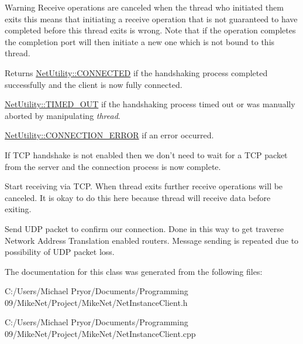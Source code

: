 \begin{DoxyWarning}{Warning}
Receive operations are canceled when the thread who initiated them exits this means that initiating a receive operation that is not guaranteed to have completed before this thread exits is wrong. Note that if the operation completes the completion port will then initiate a new one which is not bound to this thread.
\end{DoxyWarning}
\begin{DoxyReturn}{Returns}
\hyperlink{class_net_utility_a7eae52138f8bd597ffc67ebf07e86b6da9c07ac24fb9bdd4157ace978968721fd}{NetUtility::CONNECTED} if the handshaking process completed successfully and the client is now fully connected. 

\hyperlink{class_net_utility_a7eae52138f8bd597ffc67ebf07e86b6da319e02f6059b4b08edd70c16fa5206fd}{NetUtility::TIMED\_\-OUT} if the handshaking process timed out or was manually aborted by manipulating {\itshape thread\/}. 

\hyperlink{class_net_utility_a7eae52138f8bd597ffc67ebf07e86b6da7c6b34544a99c4c264366f2fed4f0973}{NetUtility::CONNECTION\_\-ERROR} if an error occurred. 
\end{DoxyReturn}


If TCP handshake is not enabled then we don't need to wait for a TCP packet from the server and the connection process is now complete.

Start receiving via TCP. When thread exits further receive operations will be canceled. It is okay to do this here because thread will receive data before exiting.

Send UDP packet to confirm our connection. Done in this way to get traverse Network Address Translation enabled routers. Message sending is repeated due to possibility of UDP packet loss.



The documentation for this class was generated from the following files:\begin{DoxyCompactItemize}
\item 
C:/Users/Michael Pryor/Documents/Programming 09/MikeNet/Project/MikeNet/NetInstanceClient.h\item 
C:/Users/Michael Pryor/Documents/Programming 09/MikeNet/Project/MikeNet/NetInstanceClient.cpp\end{DoxyCompactItemize}
